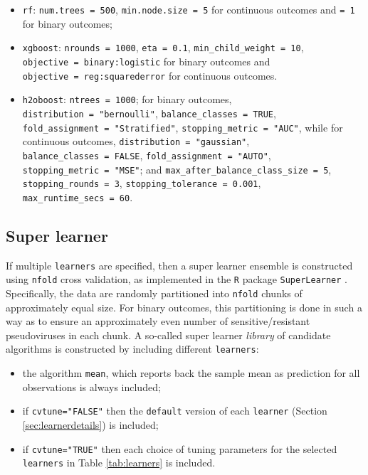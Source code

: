 \documentclass[
]{article}
\providecommand{\tightlist}{%
  \setlength{\itemsep}{0pt}\setlength{\parskip}{0pt}}
\begin{document}
\begin{itemize}
\tightlist
\item
  \texttt{rf}: \texttt{num.trees\ =\ 500}, \texttt{min.node.size\ =\ 5} for continuous outcomes and \texttt{=\ 1} for binary outcomes;
\item
  \texttt{xgboost}: \texttt{nrounds\ =\ 1000}, \texttt{eta\ =\ 0.1}, \texttt{min\_child\_weight\ =\ 10}, \texttt{objective\ =\ binary:logistic} for binary outcomes and \texttt{objective\ =\ reg:squarederror} for continuous outcomes.
\item
  \texttt{h2oboost}: \texttt{ntrees\ =\ 1000}; for binary outcomes, \texttt{distribution\ =\ "bernoulli"}, \texttt{balance\_classes\ =\ TRUE}, \texttt{fold\_assignment\ =\ "Stratified"}, \texttt{stopping\_metric\ =\ "AUC"}, while for continuous outcomes, \texttt{distribution\ =\ "gaussian"}, \texttt{balance\_classes\ =\ FALSE}, \texttt{fold\_assignment\ =\ "AUTO"}, \texttt{stopping\_metric\ =\ "MSE"}; and \texttt{max\_after\_balance\_class\_size\ =\ 5}, \texttt{stopping\_rounds\ =\ 3}, \texttt{stopping\_tolerance\ =\ 0.001}, \texttt{max\_runtime\_secs\ =\ 60}.
\end{itemize}

\hypertarget{sec:sldetails}{%
\subsection{Super learner}\label{sec:sldetails}}

If multiple \texttt{learners} are specified, then a super learner ensemble \citep{vanderlaan2007} is constructed using \texttt{nfold} cross validation, as implemented in the \texttt{R} package \texttt{SuperLearner} \citep{superlearnerpkg}. Specifically, the data are randomly partitioned into \texttt{nfold} chunks of approximately equal size. For binary outcomes, this partitioning is done in such a way as to ensure an approximately even number of sensitive/resistant pseudoviruses in each chunk. A so-called super learner \emph{library} of candidate algorithms is constructed by including different \texttt{learners}:

\begin{itemize}
\tightlist
\item
  the algorithm \texttt{mean}, which reports back the sample mean as prediction for all observations is always included;
\item
  if \texttt{cvtune="FALSE"} then the \texttt{default} version of each \texttt{learner} (Section \ref{sec:learnerdetails}) is included;
\item
  if \texttt{cvtune="TRUE"} then each choice of tuning parameters for the selected \texttt{learners} in Table \ref{tab:learners} is included.
\end{itemize}
\end{document}
